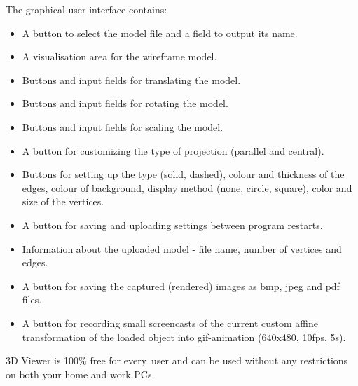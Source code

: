 \documentclass[12pt, letterpaper]{article}
\begin{document}
The graphical user interface contains:
\begin{itemize}
\item A button to select the model file and a field to output its name.
\item A visualisation area for the wireframe model.
\item Buttons and input fields for translating the model.
\item Buttons and input fields for rotating the model.
\item Buttons and input fields for scaling the model.
\item A button for customizing the type of projection (parallel and central).
\item Buttons for setting up the type (solid, dashed), colour and thickness of the edges, colour of background, display method (none, circle, square), color and size of the vertices.
\item A button for saving and uploading settings between program restarts.
\item Information about the uploaded model - file name, number of vertices and edges.
\item A button for saving the captured (rendered) images as bmp, jpeg and pdf files.
\item A button for recording small screencasts of the current custom affine transformation 
of the loaded object into gif-animation (640x480, 10fps, 5s).
\end{itemize}
3D Viewer is 100\% free for every user and can be used without any restrictions on both your home and work PCs.
\end{document}

